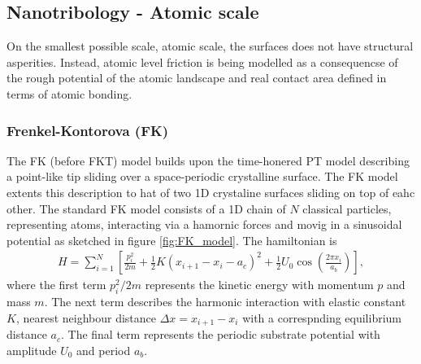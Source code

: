 
\subsection{Nanotribology - Atomic scale}



On the smallest possible scale, atomic scale, the surfaces does not have structural asperities. Instead, atomic level friction is being modelled
as a consequencse of the rough potential of the atomic landscape and real contact area defined in terms of atomic bonding. 

\subsubsection{Frenkel-Kontorova (FK)}



The FK (before FKT) model builds upon the time-honered PT model describing a point-like tip sliding over a space-periodic crystalline surface. The FK model extents this description to hat of two 1D crystaline surfaces sliding on top of eahc other. The standard FK model consists of a 1D chain of $N$ classical particles, representing atoms, interacting via a hamornic forces and movig in a sinusoidal potential as sketched in figure \ref{fig:FK_model}. The hamiltonian is 
\begin{align}
  H = \sum_{i=1}^N \left[\frac{p_i^2}{2m} + \frac{1}{2}K(x_{i+1} - x_i - a_c)^2 + \frac{1}{2}U_0 \cos{\left(\frac{2\pi x_i}{a_b}\right)}\right],
  \label{eq:H_FK}
\end{align}
where the first term $p_i^2/2m$ represents the kinetic energy with momentum $p$ and mass $m$. The next term describes the harmonic interaction with elastic constant $K$, nearest neighbour distance $\Delta x = x_{i+1} - x_i$ with a correspnding equilibrium distance $a_c$. The final term represents the periodic substrate potential with amplitude $U_0$ and period $a_b$. 

